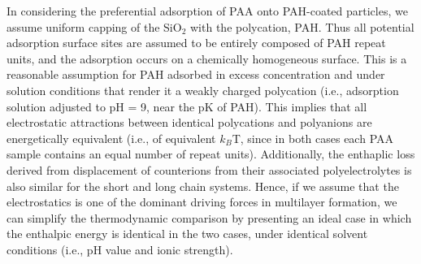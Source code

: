 \documentclass[journal=mamobx,manuscript=article]{achemso}
\begin{document}
In considering the preferential adsorption of PAA onto PAH-coated particles, we assume uniform capping of the SiO$_2$ with the polycation, PAH.  Thus all potential adsorption surface sites are assumed to be entirely composed of PAH repeat units, and the adsorption occurs on a chemically homogeneous surface.  This is a reasonable assumption for PAH adsorbed in excess concentration and under solution conditions that render it a weakly charged polycation (i.e., adsorption solution adjusted to pH = 9, near the pK of PAH).\cite{Burke2003,Smith2003}  This implies that all electrostatic attractions between identical polycations and polyanions are energetically equivalent (i.e., of equivalent $k_B$T, since in both cases each PAA sample contains an equal number of repeat units).\cite{Dubas1999}  Additionally, the enthaplic loss derived from displacement of counterions from their associated polyelectrolytes is also similar for the short and long chain systems.  Hence, if we assume that the electrostatics is one of the dominant driving forces in multilayer formation, we can simplify the thermodynamic comparison by presenting an ideal case in which the enthalpic energy is identical in the two cases, under identical solvent conditions (i.e., pH value and ionic strength). 
\end{document}
